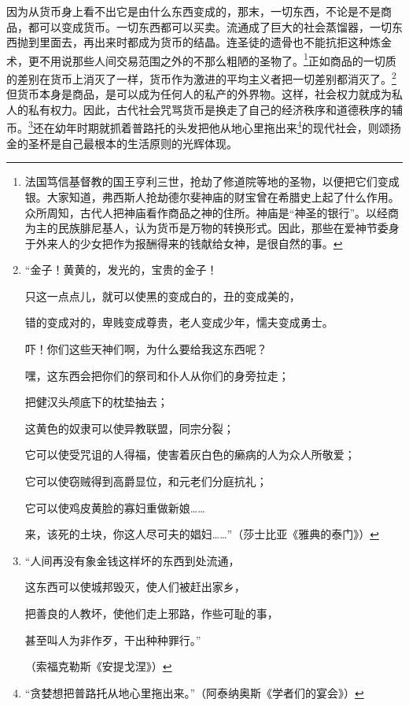 \documentclass{ctexbook}
\begin{document}
        因为从货币身上看不出它是由什么东西变成的，那末，一切东西，不论是不是商品，都可以变成货币。一切东西都可以买卖。流通成了巨大的社会蒸馏器，一切东西抛到里面去，再出来时都成为货币的结晶。连圣徒的遗骨也不能抗拒这种炼金术，更不用说那些人间交易范围之外的不那么粗陋的圣物了。\footnote{法国笃信基督教的国王亨利三世，抢劫了修道院等地的圣物，以便把它们变成银。大家知道，弗西斯人抢劫德尔斐神庙的财宝曾在希腊史上起了什么作用。众所周知，古代人把神庙看作商品之神的住所。神庙是“神圣的银行”。以经商为主的民族腓尼基人，认为货币是万物的转换形式。因此，那些在爱神节委身于外来人的少女把作为报酬得来的钱献给女神，是很自然的事。}正如商品的一切质的差别在货币上消灭了一样，货币作为激进的平均主义者把一切差别都消灭了。\footnote{“金子！黄黄的，发光的，宝贵的金子！

        只这一点点儿，就可以使黑的变成白的，丑的变成美的，

        错的变成对的，卑贱变成尊贵，老人变成少年，懦夫变成勇士。

        吓！你们这些天神们啊，为什么要给我这东西呢？

        嘿，这东西会把你们的祭司和仆人从你们的身旁拉走；

        把健汉头颅底下的枕垫抽去；

        这黄色的奴隶可以使异教联盟，同宗分裂；

        它可以使受咒诅的人得福，使害着灰白色的癞病的人为众人所敬爱；

        它可以使窃贼得到高爵显位，和元老们分庭抗礼；

        它可以使鸡皮黄脸的寡妇重做新娘……

        来，该死的土块，你这人尽可夫的娼妇……”（莎士比亚《雅典的泰门》）}但货币本身是商品，是可以成为任何人的私产的外界物。这样，社会权力就成为私人的私有权力。因此，古代社会咒骂货币是换走了自己的经济秩序和道德秩序的辅币。\footnote{“人间再没有象金钱这样坏的东西到处流通，

        这东西可以使城邦毁灭，使人们被赶出家乡，

        把善良的人教坏，使他们走上邪路，作些可耻的事，

        甚至叫人为非作歹，干出种种罪行。”

        （索福克勒斯《安提戈涅》）}还在幼年时期就抓着普路托的头发把他从地心里拖出来\footnote{“贪婪想把普路托从地心里拖出来。”（阿泰纳奥斯《学者们的宴会》）}的现代社会，则颂扬金的圣杯是自己最根本的生活原则的光辉体现。
\end{document}
